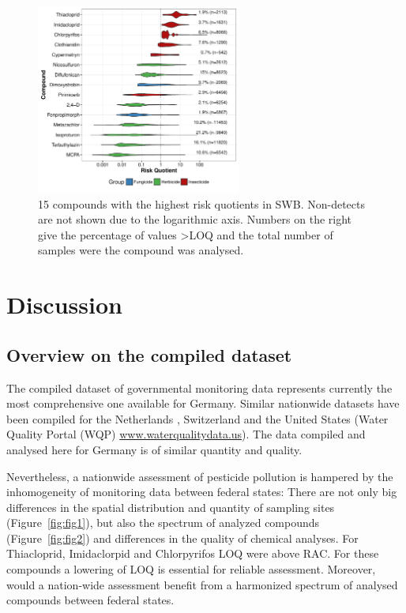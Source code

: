 \documentclass[journal=esthag,manuscript=article]{achemso}
\begin{document}
\begin{figure}[ht]
  \includegraphics[width=0.6\textwidth]{figure6.pdf}
  \caption{15 compounds with the highest risk quotients in SWB. Non-detects are not shown due to the logarithmic axis. Numbers on the right give the percentage of values \textgreater LOQ and the total number of samples were the compound was analysed.
  }
  \label{fig:fig6}
\end{figure}




\section{Discussion}
\subsection{Overview on the compiled dataset}
The compiled dataset of governmental monitoring data represents currently the most comprehensive one available for Germany.
Similar nationwide datasets have been compiled for the Netherlands \citep{vijver_spatial_2008}, Switzerland \citep{munz_pestizidmessungen_2011} and the United States (Water Quality Portal (WQP) \url{www.waterqualitydata.us}).
The data compiled and analysed here for Germany is of similar quantity and quality.

Nevertheless, a nationwide assessment of pesticide pollution is hampered by the inhomogeneity of monitoring data between federal states:
There are not only big differences in the spatial distribution and quantity of sampling sites (Figure~\ref{fig:fig1}), but also the spectrum of analyzed compounds (Figure~\ref{fig:fig2}) and differences in the quality of chemical analyses. 
For Thiacloprid, Imidaclorpid and Chlorpyrifos LOQ were above RAC.
For these compounds a lowering of LOQ is essential for reliable assessment.
Moreover, would a nation-wide assessment benefit from a harmonized spectrum of analysed compounds between federal states.
\end{document}
